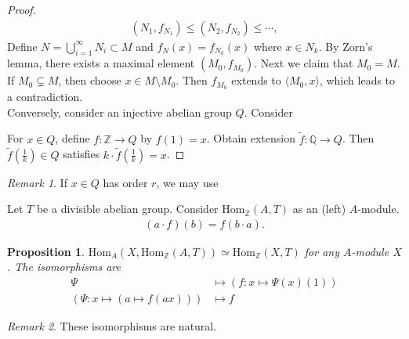 \documentclass[12pt]{article}
\theoremstyle{plain}
\newtheorem{proposition}[theorem]{Proposition}
\theoremstyle{remark}
\newtheorem*{remark}{Remark}
\theoremstyle{definition}
\newcommand{\Z}{\mathbb{Z}}
\newcommand{\Q}{\mathbb{Q}}
\newcommand{\Hom}[3]{\mathrm{Hom}_{#3}(#1,#2)}
\begin{document}
\begin{proof}
    \begin{align*}
        (N_1,f_{N_1})\le (N_2,f_{N_2})\le \cdots,
    \end{align*}
    Define $N=\bigcup_{i=1}^\infty N_i\subset M$ and $f_N(x)=f_{N_k}(x)$ where $x\in N_k$. By Zorn's lemma, there exists a maximal element $(M_0,f_{M_0})$. Next we claim that $M_0=M$. If $M_0\subsetneq M$, then choose $x\in M\setminus M_0$. Then $f_{M_0}$ extends to $\langle M_0,x\rangle$, which leads to a contradiction.\\
    Conversely, consider an injective abelian group $Q$. Consider
    \begin{figure}[H]
        \centering
    \end{figure}
    \noindent For $x\in Q$, define $f:\Z\rightarrow Q$ by $f(1)=x$. Obtain extension $\tilde{f}:\Q\rightarrow Q$. Then $\tilde{f}(\frac{1}{k})\in Q$ satisfies $k\cdot \tilde{f}(\frac{1}{k})=x$.
\end{proof}
\begin{remark}
    If $x\in Q$ has order $r$, we may use
    \begin{figure}[H]
        \centering
    \end{figure}
\end{remark}

Let $T$ be a divisible abelian group. Consider $\Hom{A}{T}{\Z}$ as an (left) $A$-module.
\begin{align*}
    (a\cdot f)(b) = f(b\cdot a).
\end{align*}

\begin{proposition}
    $\Hom{X}{\Hom{A}{T}{\Z}}{A}\simeq \Hom{X}{T}{\Z}$ for any $A$-module $X$. The isomorphisms are
    \begin{align*}
        \Psi &\mapsto \left(f:x\mapsto \Psi(x)(1) \right) \\
        \left( \Psi: x\mapsto (a\mapsto f(ax))\right) &\mapsto  f
    \end{align*}
\end{proposition}
\begin{remark}
    These isomorphisms are natural.
\end{remark}
\end{document}
